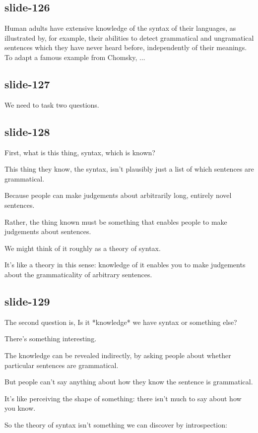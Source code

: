 \documentclass[12pt,\papersize]{extarticle}
\begin{document}
\subsection{slide-126}
Human adults have extensive knowledge of the syntax of their languages,
            as illustrated by, for example, their abilities to detect grammatical and ungramatical sentences which they have never heard before, independently of their meanings.
            To adapt a famous example from Chomsky, ...

\subsection{slide-127}
We need to task two questions.

\subsection{slide-128}
First, what is this thing, syntax, which is known?

This thing they know, the syntax, isn't plausibly just a list of which sentences are grammatical.

Because people can make judgements about arbitrarily long, entirely novel sentences.

Rather, the thing known must be something that enables people to make judgements about sentences.

We might think of it roughly as a theory of syntax.

It's like a theory in this sense: knowledge of it enables you to make judgements about the grammaticality of arbitrary sentences.

\subsection{slide-129}
The second question is, Is it *knowledge* we have syntax or something else?

There's something interesting.

The knowledge can be revealed indirectly, by asking people about whether particular sentences are grammatical.

But people can't say anything about how they know the sentence is grammatical.

It's like perceiving the shape of something: there isn't much to say about how you know.

So the theory of syntax isn't something we can discover by introspection:
\end{document}
